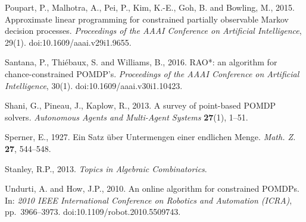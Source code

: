 \documentclass[10pt,twocolumn]{article}
\theoremstyle{plain}
\theoremstyle{definition}
\theoremstyle{remark}
\begin{document}
Poupart, P., Malhotra, A., Pei, P., Kim, K.-E., Goh, B. and Bowling, M., 2015.
Approximate linear programming for constrained partially observable Markov decision
processes. \emph{Proceedings of the AAAI Conference on Artificial Intelligence}, 29(1).
doi:10.1609/aaai.v29i1.9655.

Santana, P., Thi\'ebaux, S. and Williams, B., 2016. RAO*: an algorithm for
chance-constrained POMDP's. \emph{Proceedings of the AAAI Conference on Artificial
Intelligence}, 30(1). doi:10.1609/aaai.v30i1.10423.


Shani, G., Pineau, J., Kaplow, R., 2013. A survey of point-based POMDP solvers.
\emph{Autonomous Agents and Multi-Agent Systems} \textbf{27}(1), 1--51.

Sperner, E., 1927. Ein Satz \"uber Untermengen einer endlichen Menge. \emph{Math. Z.}
\textbf{27}, 544--548.

Stanley, R.P., 2013. \emph{Topics in Algebraic Combinatorics}.

Undurti, A. and How, J.P., 2010. An online algorithm for constrained POMDPs. In:
\emph{2010 IEEE International Conference on Robotics and Automation (ICRA)}, pp.~3966--3973.
doi:10.1109/robot.2010.5509743.
\end{document}

